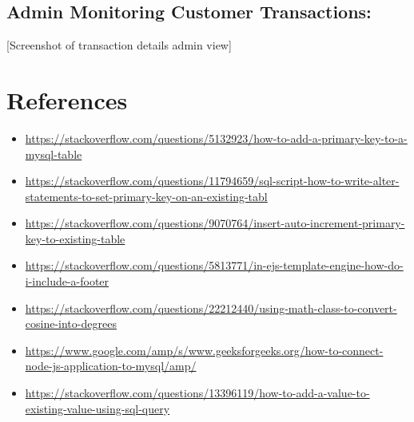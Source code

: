 \documentclass{report}
\begin{document}
\section*{Admin Monitoring Customer Transactions:}
[Screenshot of transaction details admin view]

\chapter{References}
\begin{itemize}
\item \url{https://stackoverflow.com/questions/5132923/how-to-add-a-primary-key-to-a-mysql-table}
\item \url{https://stackoverflow.com/questions/11794659/sql-script-how-to-write-alter-statements-to-set-primary-key-on-an-existing-tabl}
\item \url{https://stackoverflow.com/questions/9070764/insert-auto-increment-primary-key-to-existing-table}
\item \url{https://stackoverflow.com/questions/5813771/in-ejs-template-engine-how-do-i-include-a-footer}
\item \url{https://stackoverflow.com/questions/22212440/using-math-class-to-convert-cosine-into-degrees}
\item \url{https://www.google.com/amp/s/www.geeksforgeeks.org/how-to-connect-node-js-application-to-mysql/amp/}
\item \url{https://stackoverflow.com/questions/13396119/how-to-add-a-value-to-existing-value-using-sql-query}
\end{itemize}
\end{document}

